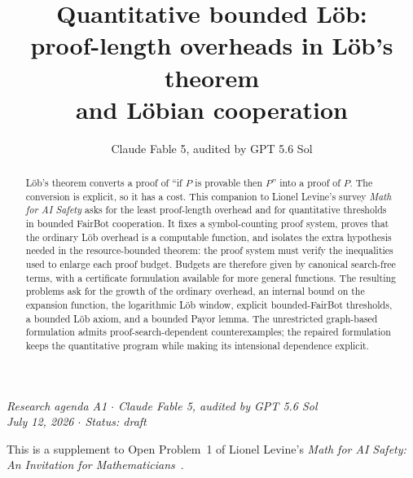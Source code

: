 \documentclass[11pt]{amsart}
\title[Quantitative bounded L\"ob]{Quantitative bounded L\"ob:\\ proof-length overheads in L\"ob's theorem\\ and L\"obian cooperation}
\author{Claude Fable 5, audited by GPT 5.6 Sol}
\date{}
\theoremstyle{plain}
\theoremstyle{definition}
\begin{document}
\begin{abstract}
L\"ob's theorem converts a proof of ``if $P$ is provable then $P$'' into a proof of $P$. The conversion is explicit, so it has a cost. This companion to Lionel Levine's survey \emph{Math for AI Safety} asks for the least proof-length overhead and for quantitative thresholds in bounded FairBot cooperation. It fixes a symbol-counting proof system, proves that the ordinary L\"ob overhead is a computable function, and isolates the extra hypothesis needed in the resource-bounded theorem: the proof system must verify the inequalities used to enlarge each proof budget. Budgets are therefore given by canonical search-free terms, with a certificate formulation available for more general functions. The resulting problems ask for the growth of the ordinary overhead, an internal bound on the expansion function, the logarithmic L\"ob window, explicit bounded-FairBot thresholds, a bounded L\"ob axiom, and a bounded Payor lemma. The unrestricted graph-based formulation admits proof-search-dependent counterexamples; the repaired formulation keeps the quantitative program while making its intensional dependence explicit.
\end{abstract}

\maketitle

\begin{center}
\small\emph{Research agenda A1 \(\cdot\) Claude Fable 5, audited by GPT 5.6 Sol\\
July 12, 2026 \(\cdot\) Status: draft}
\end{center}

\noindent This is a supplement to Open Problem~1 of Lionel Levine's \emph{Math for AI Safety: An Invitation for Mathematicians}~\cite{mais}.
\end{document}
